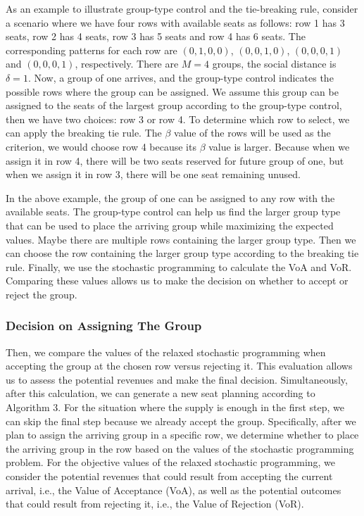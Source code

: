 As an example to illustrate group-type control and the tie-breaking rule, consider a scenario where we have four rows with available seats as follows: row 1 has 3 seats, row 2 has 4 seats, row 3 has 5 seats and row 4 has 6 seats. The corresponding patterns for each row are $(0,1,0,0)$, $(0,0,1,0)$, $(0,0,0,1)$ and $(0,0,0,1)$, respectively. There are $M =4$ groups, the social distance is $\delta =1$. Now, a group of one arrives,  and the group-type control indicates the possible rows where the group can be assigned. We assume this group can be assigned to the seats of the largest group according to the group-type control, then we have two choices: row 3 or row 4. To determine which row to select, we can apply the breaking tie rule. The $\beta$ value of the rows will be used as the criterion, we would choose row 4 because its $\beta$ value is larger. Because when we assign it in row 4, there will be two seats reserved for future group of one, but when we assign it in row 3, there will be one seat remaining unused.

In the above example, the group of one can be assigned to any row with the available seats. The group-type control can help us find the larger group type that can be used to place the arriving group while maximizing the expected values. Maybe there are multiple rows containing the larger group type. Then we can choose the row containing the larger group type according to the breaking tie rule. 
Finally, we use the stochastic programming to calculate the VoA and VoR. Comparing these values allows us to make the decision on whether to accept or reject the group.



\subsubsection*{Decision on Assigning The Group}
Then, we compare the values of the relaxed stochastic programming when accepting the group at the chosen row versus rejecting it. This evaluation allows us to assess the potential revenues and make the final decision. Simultaneously, after this calculation, we can generate a new seat planning according to Algorithm 3. For the situation where the supply is enough in the first step, we can skip the final step because we already accept the group. Specifically, after we plan to assign the arriving group in a specific row, we determine whether to place the arriving group in the row based on the values of the stochastic programming problem. For the objective values of the relaxed stochastic programming, we consider the potential revenues that could result from accepting the current arrival, i.e., the Value of Acceptance (VoA), as well as the potential outcomes that could result from rejecting it, i.e., the Value of Rejection (VoR). 

